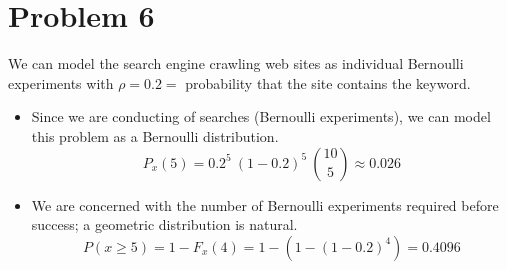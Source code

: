 \documentclass[11pt]{article}
\begin{document}
\section*{Problem 6}
We can model the search engine crawling web sites as individual Bernoulli experiments with $\rho = 0.2 = $ probability that the site contains the keyword.

\begin{itemize}
	\item
	Since we are conducting of searches (Bernoulli experiments), we can model this problem as a Bernoulli distribution. 
	\[ P_x(5) = 0.2^5\ (1-0.2)^5\ \binom{10}{5}  \approx 0.026\]
	
	\item 
	We are concerned with the number of Bernoulli experiments required before success; a geometric distribution is natural.
	\[P(x \ge 5) = 1- F_x(4) = 1 -(1- (1-0.2)^4) = 0.4096 \]
	
\end{itemize}
\end{document}
